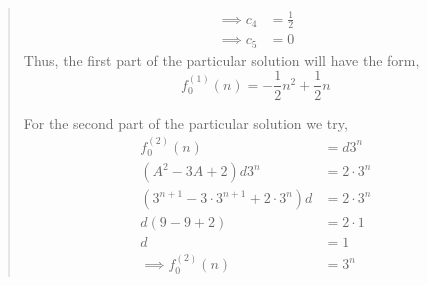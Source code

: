 \documentclass[letter]{article}
\begin{document}
\begin{enumerate}
\begin{quote}
\begin{align*}
                \implies c_4 &= \frac{1}{2} \\
                \implies c_5 &= 0 
            \end{align*}
	        Thus, the first part of the particular solution will have the form,
	        \[
	            f_0^{(1)}(n) =  -\frac{1}{2}n^2 + \frac{1}{2}n
	        \]
	        
	        For the second part of the particular solution we try,
	        \begin{align*}
	            f_0^{(2)}(n) &= d 3^n \\
	            (A^2 -3A+2)d 3^n &= 2\cdot3^n \\
	            (3^{n+1} - 3\cdot 3^{n+1} + 2\cdot3^n)d &= 2\cdot3^n \\
	            d(9 - 9 + 2) &= 2\cdot1 \\ 
	            d &= 1\\
	            \implies f_0^{(2)}(n) &= 3^n
	        \end{align*}
		

\end{quote}
\end{enumerate}
\end{document}
